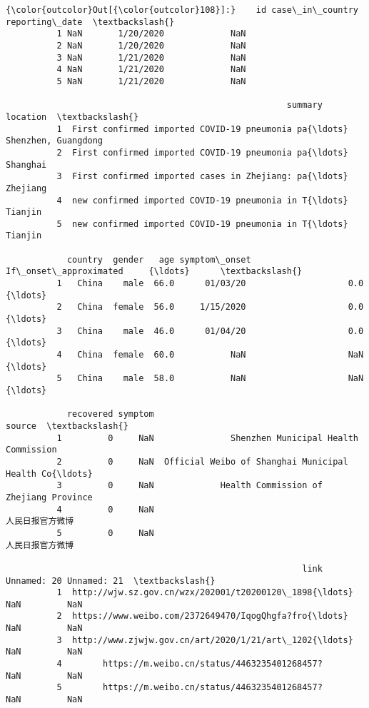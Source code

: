 \documentclass[11pt]{article}
\begin{document}
\begin{Verbatim}[commandchars=\\\{\}]
{\color{outcolor}Out[{\color{outcolor}108}]:}    id case\_in\_country  reporting\_date  \textbackslash{}
          1 NaN       1/20/2020             NaN   
          2 NaN       1/20/2020             NaN   
          3 NaN       1/21/2020             NaN   
          4 NaN       1/21/2020             NaN   
          5 NaN       1/21/2020             NaN   
          
                                                       summary             location  \textbackslash{}
          1  First confirmed imported COVID-19 pneumonia pa{\ldots}  Shenzhen, Guangdong   
          2  First confirmed imported COVID-19 pneumonia pa{\ldots}             Shanghai   
          3  First confirmed imported cases in Zhejiang: pa{\ldots}             Zhejiang   
          4  new confirmed imported COVID-19 pneumonia in T{\ldots}              Tianjin   
          5  new confirmed imported COVID-19 pneumonia in T{\ldots}              Tianjin   
          
            country  gender   age symptom\_onset  If\_onset\_approximated     {\ldots}      \textbackslash{}
          1   China    male  66.0      01/03/20                    0.0     {\ldots}       
          2   China  female  56.0     1/15/2020                    0.0     {\ldots}       
          3   China    male  46.0      01/04/20                    0.0     {\ldots}       
          4   China  female  60.0           NaN                    NaN     {\ldots}       
          5   China    male  58.0           NaN                    NaN     {\ldots}       
          
            recovered symptom                                             source  \textbackslash{}
          1         0     NaN               Shenzhen Municipal Health Commission   
          2         0     NaN  Official Weibo of Shanghai Municipal Health Co{\ldots}   
          3         0     NaN             Health Commission of Zhejiang Province   
          4         0     NaN                                           人民日报官方微博   
          5         0     NaN                                           人民日报官方微博   
          
                                                          link  Unnamed: 20 Unnamed: 21  \textbackslash{}
          1  http://wjw.sz.gov.cn/wzx/202001/t20200120\_1898{\ldots}          NaN         NaN   
          2  https://www.weibo.com/2372649470/IqogQhgfa?fro{\ldots}          NaN         NaN   
          3  http://www.zjwjw.gov.cn/art/2020/1/21/art\_1202{\ldots}          NaN         NaN   
          4        https://m.weibo.cn/status/4463235401268457?          NaN         NaN   
          5        https://m.weibo.cn/status/4463235401268457?          NaN         NaN   
          

\end{Verbatim}
\end{document}
